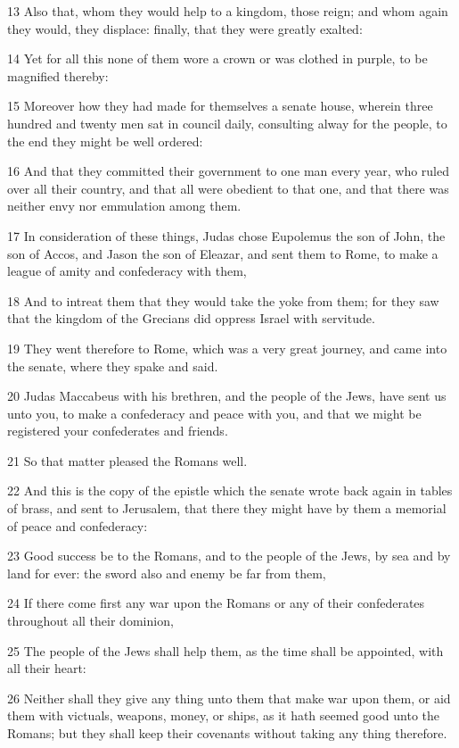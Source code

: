 \par 13 Also that, whom they would help to a kingdom, those reign; and whom again they would, they displace: finally, that they were greatly exalted:
\par 14 Yet for all this none of them wore a crown or was clothed in purple, to be magnified thereby:
\par 15 Moreover how they had made for themselves a senate house, wherein three hundred and twenty men sat in council daily, consulting alway for the people, to the end they might be well ordered:
\par 16 And that they committed their government to one man every year, who ruled over all their country, and that all were obedient to that one, and that there was neither envy nor emmulation among them.
\par 17 In consideration of these things, Judas chose Eupolemus the son of John, the son of Accos, and Jason the son of Eleazar, and sent them to Rome, to make a league of amity and confederacy with them,
\par 18 And to intreat them that they would take the yoke from them; for they saw that the kingdom of the Grecians did oppress Israel with servitude.
\par 19 They went therefore to Rome, which was a very great journey, and came into the senate, where they spake and said.
\par 20 Judas Maccabeus with his brethren, and the people of the Jews, have sent us unto you, to make a confederacy and peace with you, and that we might be registered your confederates and friends.
\par 21 So that matter pleased the Romans well.
\par 22 And this is the copy of the epistle which the senate wrote back again in tables of brass, and sent to Jerusalem, that there they might have by them a memorial of peace and confederacy:
\par 23 Good success be to the Romans, and to the people of the Jews, by sea and by land for ever: the sword also and enemy be far from them,
\par 24 If there come first any war upon the Romans or any of their confederates throughout all their dominion,
\par 25 The people of the Jews shall help them, as the time shall be appointed, with all their heart:
\par 26 Neither shall they give any thing unto them that make war upon them, or aid them with victuals, weapons, money, or ships, as it hath seemed good unto the Romans; but they shall keep their covenants without taking any thing therefore.
